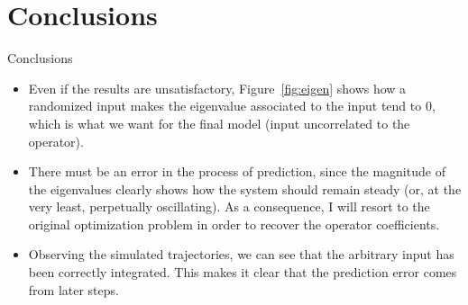 \documentclass{beamer}
\begin{document}
\section{Conclusions}

\begin{frame}{Conclusions}
    \begin{itemize}
        \item Even if the results are unsatisfactory, Figure~\ref{fig:eigen} shows how a randomized input makes the eigenvalue associated to the input tend to 0, which is what we want for the final model (input uncorrelated to the operator).
        \item There must be an error in the process of prediction, since the magnitude of the eigenvalues clearly shows how the system should remain steady (or, at the very least, perpetually oscillating). As a consequence, I will resort to the original optimization problem in order to recover the operator coefficients.
        \item Observing the simulated trajectories, we can see that the arbitrary input has been correctly integrated. This makes it clear that the prediction error comes from later steps.
    \end{itemize}
\end{frame}
\end{document}
